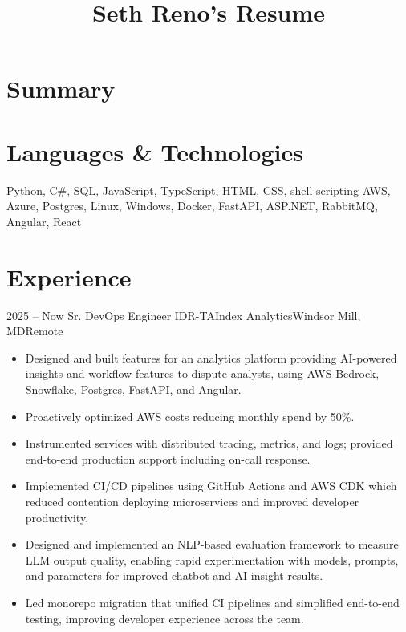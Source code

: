 \documentclass[11pt,letterpaper,final]{moderncv}
\title{Seth Reno's Resume}
\begin{document}
\maketitle
\section{Summary}

\section{Languages \& Technologies}
		{Python, C\#, SQL, JavaScript, TypeScript, HTML, CSS, shell scripting}
		{AWS, Azure, Postgres, Linux, Windows, Docker, FastAPI, ASP.NET, RabbitMQ, Angular, React}

\section{Experience} 
	\cventry
{2025 -- Now} {Sr. DevOps Engineer IDR-TA}{Index Analytics}{Windsor Mill, MD}{Remote}{
		\begin{itemize}
			\item
				Designed and built features for an analytics platform providing
				AI-powered insights and workflow features to dispute analysts,
				using AWS Bedrock, Snowflake, Postgres, FastAPI, and Angular.
			\item
				Proactively optimized AWS costs reducing monthly spend by 50\%.
			\item
				Instrumented services with distributed tracing, metrics, and logs;
				provided end-to-end production support including on-call response.
			\item
				Implemented CI/CD pipelines using GitHub Actions and AWS CDK
				which reduced contention deploying microservices and improved
				developer productivity.
			\item
				Designed and implemented an NLP-based evaluation framework to measure
				LLM output quality, enabling rapid experimentation with models,
				prompts, and parameters for improved chatbot and AI insight
				results.
			\item
				Led monorepo migration that unified CI pipelines and simplified
				end-to-end testing, improving developer experience across the team.
		\end{itemize}
}
\linebreak
\end{document}

